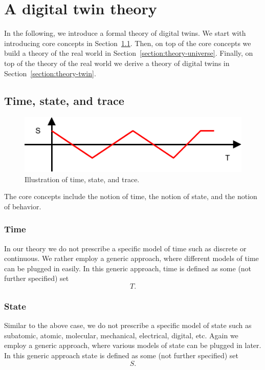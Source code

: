 \documentclass[conference]{IEEEtran}
\begin{document}
    \section{A digital twin theory}
    \label{section:theory}
    In the following, we introduce a formal theory of digital twins.
    We start with introducing core concepts in Section~\ref{section:theory-core}.
    Then, on top of the core concepts we build a theory of the real world in Section~\ref{section:theory-universe}.
    Finally, on top of the theory of the real world we derive a theory of digital twins in Section~\ref{section:theory-twin}.

    \subsection{Time, state, and trace}
    \label{section:theory-core}

    \begin{figure}[htbp]
        \centering
        \includegraphics{./figures/theory-core.pdf}
        \caption{Illustration of time, state, and trace.}
        \label{figure:theory-core}
    \end{figure}

    The core concepts include the notion of time, the notion of state, and the notion of behavior.

    \subsubsection{Time}
    In our theory we do not prescribe a specific model of time such as discrete or continuous.
    We rather employ a generic approach, where different models of time can be plugged in easily.
    In this generic approach, time is defined as some (not further specified) set
    \[
        T.
    \]

    \subsubsection{State}
    Similar to the above case, we do not prescribe a specific model of state such as subatomic, atomic, molecular, mechanical, electrical, digital, etc.
    Again we employ a generic approach, where various models of state can be plugged in later.
    In this generic approach state is defined as some (not further specified) set
    \[
        S.
    \]
\end{document}
